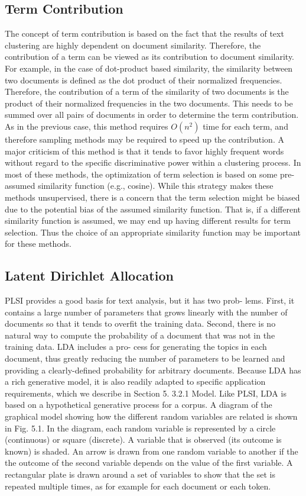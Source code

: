\subsection{Term Contribution}
The concept of term contribution \cite{Liu2003} is based on the fact that the results of text clustering are highly dependent on document similarity. Therefore, the contribution of a term can be viewed as its contribution to document similarity. For example, in the case of dot-product based similarity, the similarity between two documents is defined as the dot product of their normalized frequencies. Therefore, the contribution of a term of the similarity of two documents is the product of their normalized frequencies in the two documents. This needs to be summed over all pairs of documents in order to determine the term contribution. As in the previous case, this method requires $O(n^2)$ time for each term, and therefore sampling methods may be required to speed up the contribution. A major criticism of this method is that it tends to favor highly frequent words without regard to the specific discriminative power within a clustering process. In most of these methods, the optimization of term selection is based on some pre-assumed similarity function (e.g., cosine). While this strategy makes these methods unsupervised, there is a concern that the term selection might be biased due to the potential bias of the assumed similarity function. That is, if a different similarity function is assumed, we may end up having different results for term selection. Thus the choice of an appropriate similarity function may be important for these methods.


\subsection{Latent Dirichlet Allocation}

PLSI provides a good basis for text analysis, but it has two prob- lems. First, it contains a large number of parameters that grows linearly with the number of documents so that it tends to overfit the training data. Second, there is no natural way to compute the probability of a document that was not in the training data. LDA includes a pro- cess for generating the topics in each document, thus greatly reducing the number of parameters to be learned and providing a clearly-defined probability for arbitrary documents. Because LDA has a rich generative model, it is also readily adapted to specific application requirements, which we describe in Section 5.
3.2.1 Model. Like PLSI, LDA is based on a hypothetical generative process for a corpus. A diagram of the graphical model showing how the different random variables are related is shown in Fig. 5.1. In the diagram, each random variable is represented by a circle (continuous) or square (discrete). A variable that is observed (its outcome is known) is shaded. An arrow is drawn from one random variable to another if the the outcome of the second variable depends on the value of the first variable. A rectangular plate is drawn around a set of variables to show that the set is repeated multiple times, as for example for each document or each token.

